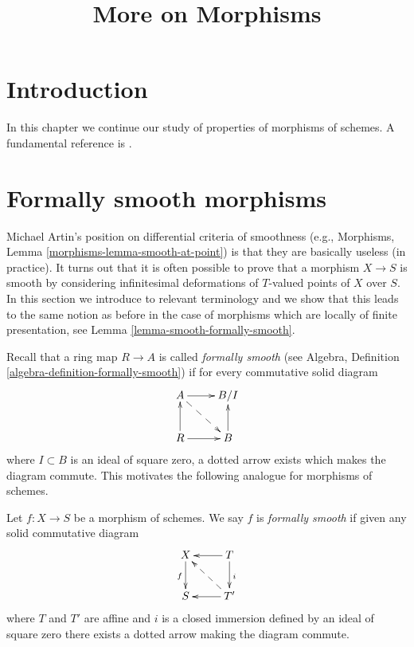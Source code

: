 

%


\title{More on Morphisms}


\maketitle

\label{section-phantom}

\tableofcontents

\section{Introduction}
\label{section-introduction}

\noindent
In this chapter we continue our study of properties of morphisms of schemes.
A fundamental reference is \cite{EGA}.









\section{Formally smooth morphisms}
\label{section-formally-smooth}

\noindent
Michael Artin's position on differential criteria of smoothness (e.g.,
Morphisms, Lemma \ref{morphisms-lemma-smooth-at-point}) is that they are
basically useless (in practice). It turns out that it is
often possible to prove that a morphism $X \to S$ is smooth by considering
infinitesimal deformations of $T$-valued points of $X$ over $S$. In this
section we introduce to relevant terminology and we show that this leads
to the same notion as before in the case of morphisms which are locally
of finite presentation, see Lemma \ref{lemma-smooth-formally-smooth}.

\medskip\noindent
Recall that a ring map $R \to A$ is called {\it formally smooth}
(see Algebra, Definition \ref{algebra-definition-formally-smooth})
if for every commutative solid diagram
$$
\xymatrix{
A \ar[r] \ar@{-->}[rd] & B/I \\
R \ar[r] \ar[u] & B \ar[u]
}
$$
where $I \subset B$ is an ideal of square zero, a dotted
arrow exists which makes the diagram commute. This motivates
the following analogue for morphisms of schemes.

\begin{definition}
\label{definition-formally-smooth}
Let $f : X \to S$ be a morphism of schemes.
We say $f$ is {\it formally smooth} if given any solid commutative diagram
$$
\xymatrix{
X \ar[d]_f & T \ar[d]^i \ar[l] \\
S & T' \ar[l] \ar@{-->}[lu]
}
$$
where $T$ and $T'$ are affine and $i$ is a closed immersion defined
by an ideal of square zero there exists a dotted arrow making the diagram
commute.
\end{definition}


